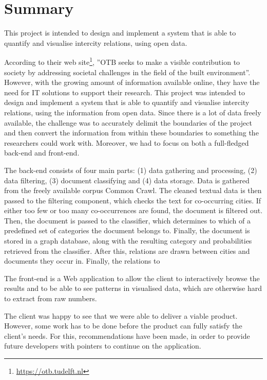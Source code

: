 \chapter*{Summary}
This project is intended to design and implement a system that is able to quantify and visualise intercity relations, using open data. 

According to their web site\footnote{\url{https://otb.tudelft.nl}}, ”OTB seeks to make a visible contribution to society by addressing societal challenges in the field of the built environment”. However, with the growing amount of information available online, they have the need for IT solutions to support their research. This project was intended to design and implement a system that is able to quantify and visualise intercity relations, using the information from open data. Since there is a lot of data freely available, the challenge was to accurately delimit the boundaries of the project and then convert the information from within these boundaries to something the researchers could work with. Moreover, we had to focus on both a full-fledged back-end and front-end. 

The back-end consists of four main parts: (1) data gathering and processing, (2) data filtering, (3) document classifying and (4) data storage. Data is gathered from the freely available corpus Common Crawl. The cleaned textual data is then passed to the filtering component, which checks the text for co-occurring cities. If either too few or too many co-occurrences are found, the document is filtered out. Then, the document is passed to the classifier, which determines to which of a predefined set of categories the document belongs to. Finally, the document is stored in a graph database, along with the resulting category and probabilities retrieved from the classifier. After this, relations are drawn between cities and documents they occur in. Finally, the relations to

The front-end is a Web application to allow the client to interactively browse the results and to be able to see patterns in visualised data, which are otherwise hard to extract from raw numbers.

The client was happy to see that we were able to deliver a viable product. However, some work has to be done before the product can fully satisfy the client’s needs. For this, recommendations have been made, in order to provide future developers with pointers to continue on the application.